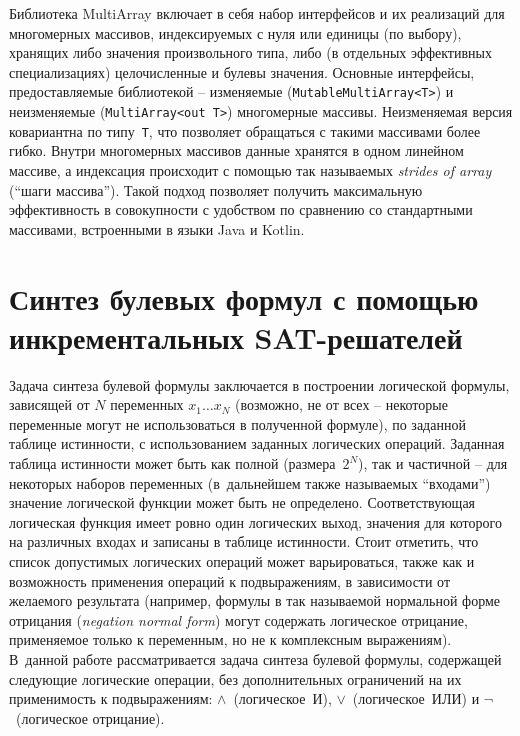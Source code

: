 Библиотека MultiArray включает в себя набор интерфейсов и их реализаций для многомерных массивов, индексируемых с нуля или единицы (по выбору), хранящих либо значения произвольного типа, либо (в отдельных эффективных специализациях) целочисленные и булевы значения.
Основные интерфейсы, предоставляемые библиотекой \--- изменяемые (\texttt{Mutable\-Multi\-Array<T>}) и неизменяемые (\texttt{Multi\-Array<out~T>}) многомерные массивы.
Неизменяемая версия ковариантна по типу~\texttt{T}, что позволяет обращаться с такими массивами более гибко.
Внутри многомерных массивов данные хранятся в одном линейном массиве, а индексация происходит с помощью так называемых \textit{strides of array} (\enquote{шаги массива}).
Такой подход позволяет получить максимальную эффективность в совокупности с удобством по сравнению со стандартными массивами, встроенными в языки Java и Kotlin.


\section{Синтез булевых формул с помощью инкрементальных SAT-решателей}
\label{sec:formula-synthesis}

Задача синтеза булевой формулы заключается в построении логической формулы, зависящей от $N$ переменных $x_{1}\ldots x_{N}$ (возможно, не от всех \--- некоторые переменные могут не использоваться в полученной формуле), по заданной таблице истинности, с использованием заданных логических операций.
Заданная таблица истинности может быть как полной (размера~$2^{N}$), так и частичной \--- для некоторых наборов переменных (в~дальнейшем также называемых \enquote{входами}) значение логической функции может быть не определено.
Соответствующая логическая функция имеет ровно один логических выход, значения для которого на различных входах и записаны в таблице истинности.
Стоит отметить, что список допустимых логических операций может варьироваться, также как и возможность применения операций к подвыражениям, в зависимости от желаемого результата (например, формулы в так называемой нормальной форме отрицания (\textit{negation normal form}) могут содержать логическое отрицание, применяемое только к переменным, но не к комплексным выражениям).
В~данной работе рассматривается задача синтеза булевой формулы, содержащей следующие логические операции, без дополнительных ограничений на их применимость к подвыражениям: $\land$~(логическое~И), $\lor$~(логическое~ИЛИ) и $\neg$~(логическое отрицание).

